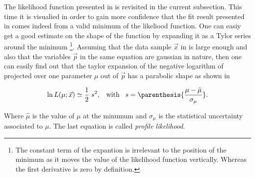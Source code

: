 The likelihood function presented in  is revisited in the current subsection.
This time it is visualied in order to gain more confidence that the fit result presented in 
comes indeed from a valid minimum of the likeliood function. One can easiy get a good estimate on the shape of the function
by expanding it as a Tylor series around the 
minimum \footnote{The constant term of the
expantion is irrelevant to the position of the minimum as it moves the value of the likelihood function vertically. Whereas
the first derivative is zero by definition.}. Assuming that the data sample $\vec{x}$ in  is large enough
and also that the variables $\vec{p}$ in the same equation are gaussian in nature, then one can easily find out that the 
taylor expansion of the negative logarithm of  projected over one parameter $\mu$ out of $\vec{p}$ has a
parabolic shape as shown in 
 
\begin{equation}
\ln L(\mu;\vec{x}) \simeq \frac{1}{2} \; s^2, \;\;\; \text{with} \;\;\; s = \parenthesis{\frac{\mu-\hat{\mu}}{\sigma_{\mu}}}.
\label{likelihood_exp}
\end{equation}

\noindent Where $\hat{\mu}$ is the value of $\mu$ at the minumum and $\sigma_{\mu}$ is the statistical uncertainty associated
to $\mu$. The last equation is called {\it profile likelihood}.

